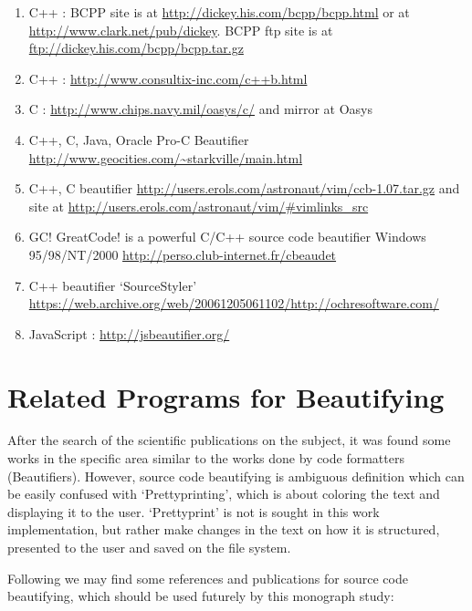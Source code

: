 \begin{sloppypar}
\begin{bluebox}
\begin{enumerate}[leftmargin=*,parsep=0pt]
    \item C++ : BCPP site is at \url{http://dickey.his.com/bcpp/bcpp.html} or at \url{http://www.clark.net/pub/dickey}.
    BCPP ftp site is at \url{ftp://dickey.his.com/bcpp/bcpp.tar.gz}

    \item C++ : \url{http://www.consultix-inc.com/c++b.html}
    \item C : \url{http://www.chips.navy.mil/oasys/c/} and mirror at Oasys
    \item C++, C, Java, Oracle Pro-C Beautifier \url{http://www.geocities.com/~starkville/main.html}

    \item C++, C beautifier \url{http://users.erols.com/astronaut/vim/ccb-1.07.tar.gz} and site at
    \url{http://users.erols.com/astronaut/vim/#vimlinks_src}

    \item GC! GreatCode! is a powerful C/C++ source code beautifier Windows 95/98/NT/2000
    \url{http://perso.club-internet.fr/cbeaudet}

    \item C++ beautifier `SourceStyler' \url{https://web.archive.org/web/20061205061102/http://ochresoftware.com/}
    \item JavaScript : \url{http://jsbeautifier.org/}

\end{enumerate}
\end{bluebox}
\end{sloppypar}


\section{Related Programs for Beautifying}

After the search of the scientific publications on the subject,
it was found some works in the specific area similar to the works done by code formatters (Beautifiers).
However,
source code beautifying is ambiguous definition which can be easily confused with `Prettyprinting',
which is about coloring the text and displaying it to the user.
`Prettyprint' is not is sought in this work implementation,
but rather make changes in the text on how it is structured,
presented to the user and saved on the file system.

Following we may find some references and publications for source code beautifying,
which should be used futurely by this monograph study:

